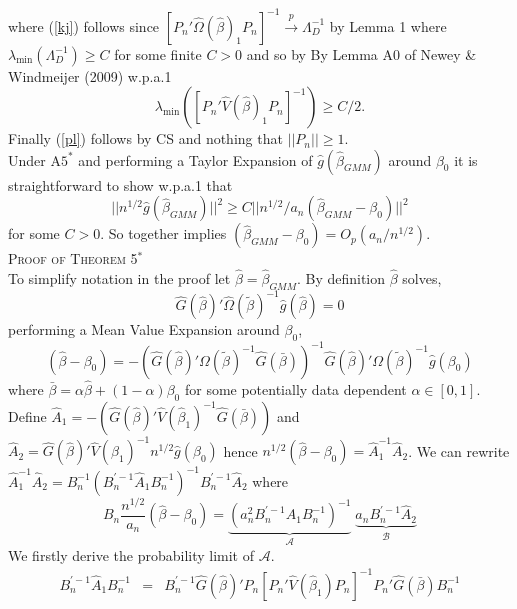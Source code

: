 \documentclass[11pt, fleqn]{article}
\begin{document}
where (\ref{kj}) follows since   $[P_n'\hat{\Omega}(\hat{\beta})_1P_n]^{-1}\overset{p}{\rightarrow} \Lambda_D^{-1}$  by Lemma 1 where $\lambda_{\min}(\Lambda_D^{-1})\geq C$ for some finite $C>0$ and so by
By Lemma A0 of Newey \& Windmeijer (2009) w.p.a.1
\begin{equation}\lambda_{\min}([P_n'\hat{V}(\hat{\beta})_1P_n]^{-1})\geq C/2. \end{equation}
Finally (\ref{pl}) follows by CS and nothing that $|\!|P_n|\!|\geq 1$.\\

Under A$5^*$ and performing a Taylor Expansion of $\hat{g}(\hat{\beta}_{GMM})$ around $\beta_0$ it is straightforward to show  w.p.a.1 that
 \begin{equation}
 |\!|n^{1/2}\hat{g}(\hat{\beta}_{GMM})|\!|^2\geq 
   C |\!|n^{1/2}/a_n(\hat{\beta}_{GMM}-\beta_0)|\!|^2
 \end{equation}
 for some $C>0$.
 So together implies $(\hat{\beta}_{GMM}-\beta_0)=O_p(a_n/n^{1/2})$.\\












\textsc{Proof of Theorem 5$^*$}\\

To simplify notation in the proof let $\hat{\beta}=\hat{\beta}_{GMM}$.
 By definition $\hat{\beta}$ solves,
\begin{equation} \hat{G}(\hat{\beta})'\hat \Omega(\tilde{\beta})^{-1}\hat{g}(\hat{\beta})=0\end{equation}
performing a Mean Value Expansion around $\beta_0$,
\begin{equation} \label{bexpan}(\hat{\beta}-\beta_0)=-(\hat{G}(\hat{\beta})'\Omega(\tilde{\beta})^{-1}\hat{G}(\bar{\beta}))^{-1}
\hat{G}(\hat{\beta})'\Omega(\tilde{\beta})^{-1}\hat{g}(\beta_0)\end{equation}
where $\bar{\beta}=\alpha \hat{\beta}+(1-\alpha)\beta_0$ for some potentially data dependent $\alpha\in [0,1]$.\\




 Define $\hat{A}_1=-(\hat{G}(\hat{\beta})'\hat{V}(\hat{\beta}_1)^{-1}\hat{G}(\bar{\beta}))$ and $\hat{A}_2= \hat{G}(\hat{\beta})'\hat{V}(\hat{\beta}_1)^{-1}n^{1/2}\hat{g}(\beta_0)$ hence $n^{1/2}(\hat{\beta}-\beta_0)=\hat{A}_1^{-1}\hat{A}_2$. We can rewrite   $\hat{A}_1^{-1}\hat{A}_2=B_n^{-1}(B_n^{'-1}\hat{A}_1 B_n^{-1})^{-1}
 B_n^{'-1}\hat{A}_2$ where 
 \begin{equation}B_n \frac{n^{1/2}}{a_n}(\hat{\beta}-\beta_0) =\underset{\mathcal{A}}{\underbrace{(a_n^2B_n^{'-1}\hat{A}_1 B_n^{-1})^{-1}}}\;\underset{\mathcal{B}}{\underbrace{a_nB_n^{'-1}\hat{A}_2}}
 \end{equation}
We firstly derive the probability limit of $\mathcal{A}$.
\begin{eqnarray}B_n^{'-1}\hat{A}_1 B_n^{-1} &=&B_n^{'-1}\hat{G}(\hat{\beta})'P_n\left[P_n'\hat{V}(\hat{\beta}_1)P_n\right]^{-1}P_n'\hat{G}(\bar{\beta})B_n^{-1} 
 \end{eqnarray}
\end{document}
